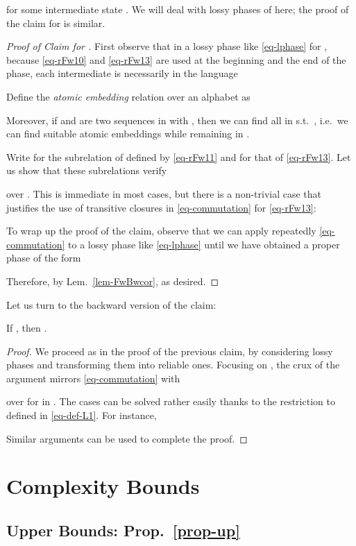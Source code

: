 for some intermediate state .  We will deal with lossy phases of
 here; the proof of the claim for  is similar.
\begin{proof}[Proof of Claim for ]
  First observe that in a lossy phase like \eqref{eq-lphase} for
  , because \eqref{eq-rFw10} and \eqref{eq-rFw13} are used
  at the beginning and the end of the phase, each intermediate  is necessarily in the language
  

  Define the \emph{atomic embedding} relation over an alphabet  as
  
  Moreover, if  and  are
  two sequences in  with , then we can find
   all in  s.t.\ , i.e.\ we can find suitable atomic embeddings
  while remaining in .

  Write  for the subrelation of  defined by
  \eqref{eq-rFw11} and  for that of
  \eqref{eq-rFw13}.  Let us show that these subrelations verify
  
  over .  This is immediate in most cases, but there
  is a non-trivial case that justifies the use of transitive
  closures in \eqref{eq-commutation} for \eqref{eq-rFw13}:
  
  
  To wrap up the proof of the claim, observe that we can apply
  repeatedly \eqref{eq-commutation} to a lossy phase
  like \eqref{eq-lphase} until we have obtained a proper phase of the
  form
  
  Therefore, by Lem.~\ref{lem-FwBwcor},
   as desired.
\end{proof}

Let us turn to the backward version of the claim:
\begin{claim}
  If , then
  .
\end{claim}
\begin{proof}
  We proceed as in the proof of the previous claim, by considering
  lossy phases and transforming them into reliable ones.  Focusing on
  , the crux of
  the argument mirrors \eqref{eq-commutation} with
  
  over  for  in .
  The cases can be solved rather easily thanks to the restriction to
   defined in \eqref{eq-def-L1}.  For instance,
  
  Similar arguments can be used to complete the proof.  
\end{proof}

\section{Complexity Bounds}

\subsection{Upper Bounds: Prop.~\ref{prop-up}}\label{ax-upb}
